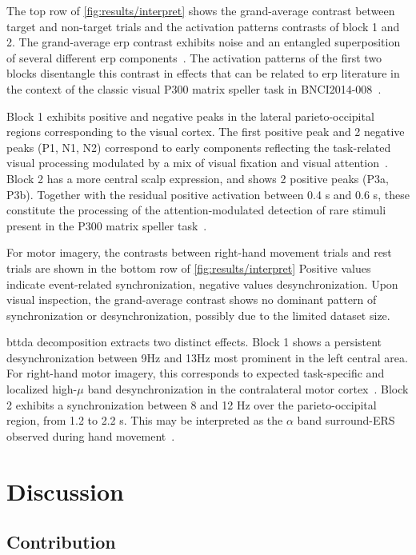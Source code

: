 \documentclass[twocolumn]{article}
\begin{document}
The top row of \cref{fig:results/interpret} shows the grand-average contrast
between target and non-target trials and the activation patterns contrasts of
block 1 and 2.
The grand-average \ac{erp} contrast exhibits noise and an entangled superposition
of several different \ac{erp} components~\cite{Luck2011}.
The activation patterns of the first two blocks disentangle this contrast
in effects that can be related to \ac{erp} literature in the context of the
classic visual P300 matrix speller task in BNCI2014-008~\cite{Riccio2013}.

Block 1 exhibits positive and negative peaks in the lateral parieto-occipital
regions corresponding to the visual cortex.
The first positive peak and 2 negative peaks (P1, N1, N2)
correspond to early components reflecting the task-related visual processing
modulated by a mix of visual fixation and visual attention~\cite{Treder2010}.
Block 2 has a more central scalp expression, and shows 2 positive peaks (P3a, P3b).
Together with the residual positive activation between 0.4 s and 0.6 s, these
constitute the processing of the attention-modulated detection of rare stimuli
present in the P300 matrix speller task~\cite{Kamp2013}.

For motor imagery, the contrasts between right-hand movement trials and rest trials
are shown in the bottom row of \cref{fig:results/interpret}
Positive values indicate event-related synchronization, negative values
desynchronization.
Upon visual inspection, the grand-average contrast shows no dominant pattern of
synchronization or desynchronization, possibly due to the limited dataset size.

\Ac{bttda} decomposition extracts two distinct effects.
Block 1 shows a persistent desynchronization between 9Hz and 13Hz most prominent
in the left central area.
For right-hand motor imagery, this corresponds to expected task-specific and
localized high-$\mu$ band desynchronization in the contralateral motor
cortex~\cite{Pfurtscheller2000,Wolpaw2012}.
Block 2 exhibits a synchronization between 8 and 12 Hz over the
parieto-occipital region, from 1.2 to 2.2 s.
This may be interpreted as the $\alpha$ band surround-ERS observed during hand
movement~\cite{Suffczynski1999, Gerloff1998,Wolpaw2012}.




\section{Discussion}
\subsection{Contribution}
\end{document}
